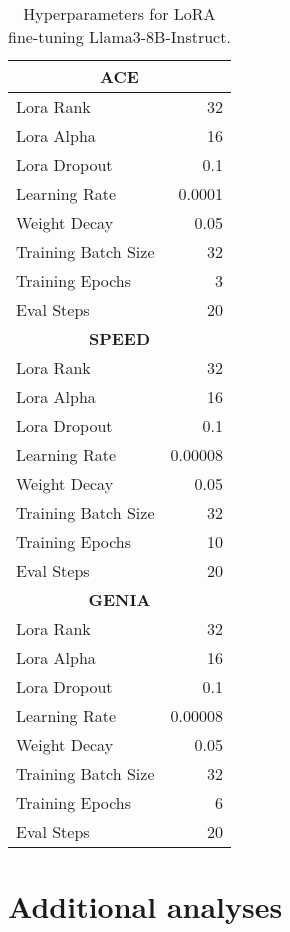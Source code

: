 \begin{table}[h]
    \centering
    \small
    \begin{tabular}{lr}
        \toprule
        \multicolumn{2}{c}{\textbf{ACE}} \\
        \midrule
        Lora Rank & 32 \\
        Lora Alpha & 16 \\
        Lora Dropout & 0.1 \\
        Learning Rate & 0.0001 \\
        Weight Decay & 0.05 \\
        Training Batch Size & 32 \\
        Training Epochs & 3 \\
        Eval Steps & 20 \\
        \midrule
        \multicolumn{2}{c}{\textbf{SPEED}} \\
        \midrule
        Lora Rank & 32 \\
        Lora Alpha & 16 \\
        Lora Dropout & 0.1 \\
        Learning Rate & 0.00008 \\
        Weight Decay & 0.05 \\
        Training Batch Size & 32 \\
        Training Epochs & 10 \\
        Eval Steps & 20 \\
        \midrule
        \multicolumn{2}{c}{\textbf{GENIA}} \\
        \midrule
        Lora Rank & 32 \\
        Lora Alpha & 16 \\
        Lora Dropout & 0.1 \\
        Learning Rate & 0.00008 \\
        Weight Decay & 0.05 \\
        Training Batch Size & 32 \\
        Training Epochs & 6 \\
        Eval Steps & 20 \\
        \bottomrule
    \end{tabular}
    \caption{Hyperparameters for LoRA fine-tuning Llama3-8B-Instruct.}
    \label{tab:hyper-sft}
\end{table}

\section{Additional analyses}


